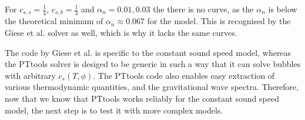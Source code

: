 For $c_{s,s}=\frac{1}{4}$, $c_{s,b}=\frac{1}{3}$ and $\alpha_n = 0.01, 0.03$ the there is no curve,
as the $\alpha_n$ is below the theoretical minimum of $\alpha_n \approx 0.067$ for the model.
This is recognised by the Giese et al. solver as well,
which is why it lacks the same curves.

The code by Giese et al. is specific to the constant sound speed model,
whereas the PTtools solver is desiged to be generic in such a way that
it can solve bubbles with arbitrary $c_s(T,\phi)$.
The PTtools code also enables easy extraction of various thermodynamic quantities,
and the gravitational wave spectra.
Therefore, now that we know that PTtools works reliably for the constant sound speed model,
the next step is to test it with more complex models.
